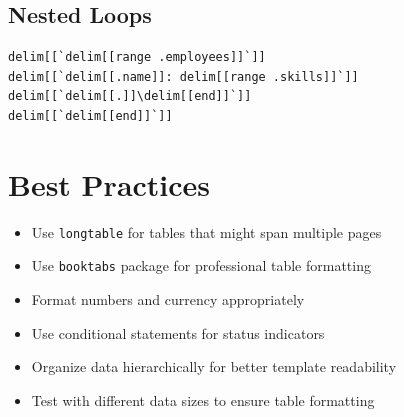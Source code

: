 \documentclass{article}
\begin{document}
\subsection{Nested Loops}
\begin{verbatim}
delim[[`delim[[range .employees]]`]]
delim[[`delim[[.name]]: delim[[range .skills]]`]]
delim[[`delim[[.]]\delim[[end]]`]]
delim[[`delim[[end]]`]]
\end{verbatim}

\section{Best Practices}

\begin{itemize}
\item Use \texttt{longtable} for tables that might span multiple pages
\item Use \texttt{booktabs} package for professional table formatting
\item Format numbers and currency appropriately
\item Use conditional statements for status indicators
\item Organize data hierarchically for better template readability
\item Test with different data sizes to ensure table formatting
\end{itemize}
\end{document}
